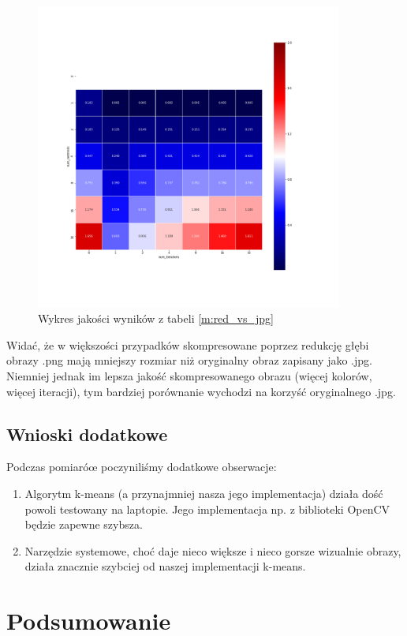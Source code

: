 \begin{figure}[H]
	\includegraphics[width=0.9\textwidth]{photos/plots/red_vs_jpg}
    \caption{Wykres jakości wyników z tabeli \ref{m:red_vs_jpg}}
\end{figure}

Widać, że w większości przypadków skompresowane poprzez redukcję głębi obrazy .png mają mniejszy rozmiar niż oryginalny obraz zapisany jako .jpg. Niemniej jednak im lepsza jakość skompresowanego obrazu (więcej kolorów, więcej iteracji), tym bardziej porównanie wychodzi na korzyść oryginalnego .jpg.

\subsection{Wnioski dodatkowe}

Podczas pomiaróœ poczyniliśmy dodatkowe obserwacje:
\begin{enumerate}
\item Algorytm k-means (a przynajmniej nasza jego implementacja) działa dość powoli testowany na laptopie. Jego implementacja np. z biblioteki OpenCV będzie zapewne szybsza.
\item Narzędzie systemowe, choć daje nieco większe i nieco gorsze wizualnie obrazy, działa znacznie szybciej od naszej implementacji k-means.
\end{enumerate}

\section{Podsumowanie}

